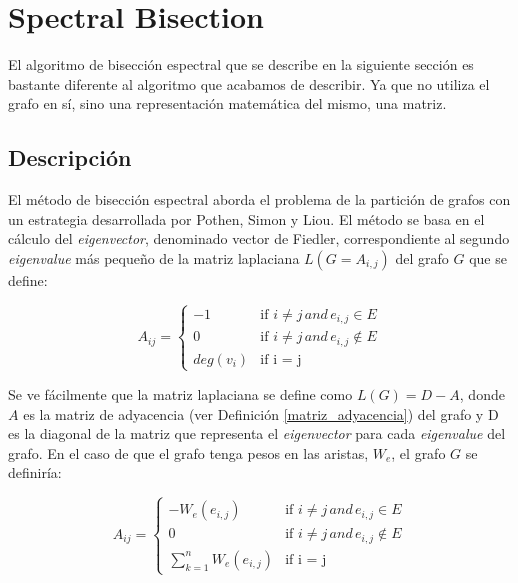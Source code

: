 \section{Spectral Bisection}\label{Spectral-Bisection}

El algoritmo de bisección espectral que se describe en la siguiente sección es bastante diferente al algoritmo que acabamos de describir. Ya que no utiliza el grafo en sí, sino una representación matemática del mismo, una matriz.

\subsection{Descripción}

El método de bisección espectral aborda el problema de la partición de grafos con un estrategia desarrollada por Pothen, Simon y Liou\cite{PothenSimon}. El método se basa en el cálculo del \textit{eigenvector}, denominado vector de Fiedler\cite{Fiedler}, correspondiente al segundo \textit{eigenvalue} más pequeño de la matriz laplaciana $L(G = A_{i,j})$ del grafo $G$ que se define:

\begin{center}
	$$
	A_{ij} = 
	\begin{cases}
	-1 & \text{if $i \neq j \, and \, e_{i, j} \in E$} \\
	0 & \text{if $i \neq j \, and \, e_{i, j} \notin E$} \\
	 deg(v_{i}) & \text{if i = j} 
	\end{cases}
	$$
\end{center}

Se ve fácilmente que la matriz laplaciana se define como $L(G) = D - A$, donde $A$ es la matriz de adyacencia (ver Definición \ref{matriz_adyacencia}) del grafo y D es la diagonal de la matriz que representa el \textit{eigenvector} para cada \textit{eigenvalue} del grafo. En el caso de que el grafo tenga pesos en las aristas, $W_{e}$, el grafo $G$ se definiría:

\begin{center}
	$$
	A_{ij} = 
	\begin{cases}
	-W_{e}(e_{i, j}) & \text{if $i \neq j \, and \, e_{i, j} \in E$} \\
	0 & \text{if $i \neq j \, and \, e_{i, j} \notin E$} \\
	\sum_{k=1}^{n} W_{e}(e_{i, j}) & \text{if i = j} 
	\end{cases}
	$$
\end{center}

